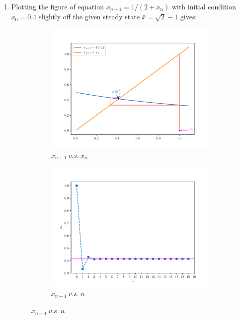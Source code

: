 \begin{homeworkProblem}[2]
\begin{enumerate}
\item Plotting the figure of equation $x_{n+1} = 1/(2+x_n)$ with initial
condition $x_0 = 0.4$ slightly off the given steady state $\bar x = \sqrt{2}
- 1$ gives:
\begin{figure}[h]
    \centering
    \begin{subfigure}[t]{0.4\linewidth}
        \centering
        \includegraphics[scale=0.5]{fig/fig2(c)_cob.pdf}
        \caption{$x_{n+1}\ v.s.\ x_n$}
    \end{subfigure}
    \hfill
    \begin{subfigure}[t]{0.4\linewidth}
        \centering
        \includegraphics[scale=0.5]{../fig/fig2(c).pdf}
        \caption{$x_{n+1}\ v.s.\ n$}
    \end{subfigure}

\end{figure}
\end{enumerate}
\end{homeworkProblem}
